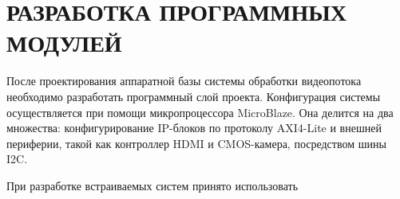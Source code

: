 \section{РАЗРАБОТКА ПРОГРАММНЫХ МОДУЛЕЙ}
\label{sec:software_modules}

После проектирования аппаратной базы системы обработки видеопотока
необходимо разработать программный слой проекта. Конфигурация системы
осуществляется при помощи микропроцессора MicroBlaze. Она делится
на два множества: конфигурирование IP-блоков по протоколу AXI4-Lite и
внешней периферии, такой как контроллер HDMI и CMOS-камера, посредством
шины I2C.

При разработке встраиваемых систем принято использовать